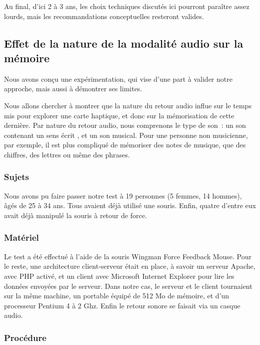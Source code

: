 \documentclass[
]{book}
\begin{document}
Au final, d'ici 2 à 3 ans, les choix techniques discutés ici pourront
paraître assez lourds, mais les recommandations conceptuelles resteront
valides.

\hypertarget{effet-de-la-nature-de-la-modalituxe9-audio-sur-la-muxe9moire}{%
\subsection{Effet de la nature de la modalité audio sur la mémoire}\label{effet-de-la-nature-de-la-modalituxe9-audio-sur-la-muxe9moire}}

Nous avons conçu une expérimentation, qui vise d'une part à valider notre
approche, mais aussi à démontrer ses limites.

Nous allons chercher à montrer que la nature du retour audio influe sur le
temps mis pour explorer une carte haptique, et donc sur la mémorisation de
cette dernière. Par nature du retour audio, nous comprenons le type de son~:
un son contenant un sens écrit , et un son musical. Pour une personne non
musicienne, par exemple, il est plus compliqué de mémoriser des notes de
musique, que des chiffres, des lettres ou même des phrases.

\hypertarget{sujets-1}{%
\subsubsection{Sujets}\label{sujets-1}}

Nous avons pu faire passer notre test à 19 personnes (5 femmes, 14
hommes), âgés de 25 à 34 ans. Tous avaient déjà utilisé une souris. Enfin,
quatre d'entre eux avait déjà manipulé la souris à retour de force.

\hypertarget{matuxe9riel-1}{%
\subsubsection{Matériel}\label{matuxe9riel-1}}

Le test a été effectué à l'aide de la souris Wingman Force Feedback Mouse.
Pour le reste, une architecture client-serveur était en place, à savoir un
serveur Apache, avec PHP activé, et un client avec Microsoft Internet
Explorer pour lire les données envoyées par le serveur. Dans notre cas, le
serveur et le client tournaient sur la même machine, un portable équipé de
512 Mo de mémoire, et d'un processeur Pentium 4 à 2 Ghz. Enfin le retour
sonore se faisait via un casque audio.

\hypertarget{procuxe9dure-1}{%
\subsubsection{Procédure}\label{procuxe9dure-1}}
\end{document}
